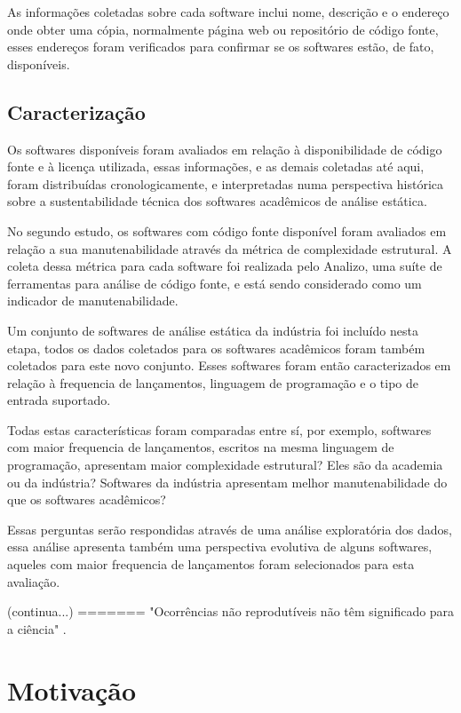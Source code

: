 As informações coletadas sobre cada software inclui nome, descrição e o
endereço onde obter uma cópia, normalmente página web ou repositório de código
fonte, esses endereços foram verificados para confirmar se os softwares estão,
de fato, disponíveis.

\subsection{Caracterização}
Os softwares disponíveis foram avaliados em relação à disponibilidade de código
fonte e à licença utilizada, essas informações, e as demais coletadas até aqui,
foram distribuídas cronologicamente, e interpretadas numa perspectiva histórica
sobre a sustentabilidade técnica dos softwares acadêmicos de análise estática.

No segundo estudo, os softwares com código fonte disponível foram avaliados em
relação a sua manutenabilidade através da métrica de complexidade estrutural. A
coleta dessa métrica para cada software foi realizada pelo Analizo, uma suíte
de ferramentas para análise de código fonte, e está sendo considerado como um
indicador de manutenabilidade.

Um conjunto de softwares de análise estática da indústria foi incluído nesta
etapa, todos os dados coletados para os softwares acadêmicos foram também
coletados para este novo conjunto. Esses softwares foram então caracterizados em
relação à frequencia de lançamentos, linguagem de programação e o tipo de
entrada suportado.

Todas estas características foram comparadas entre sí, por exemplo, softwares
com maior frequencia de lançamentos, escritos na mesma linguagem de
programação, apresentam maior complexidade estrutural? Eles são da academia ou
da indústria? Softwares da indústria apresentam melhor manutenabilidade do que
os softwares acadêmicos?

Essas perguntas serão respondidas através de uma análise exploratória dos
dados, essa análise apresenta também uma perspectiva evolutiva de alguns
softwares, aqueles com maior frequencia de lançamentos foram selecionados para
esta avaliação.

(continua...)
=======
"Ocorrências não reprodutíveis não têm significado para a ciência" \cite{popper2004logica}.

\section{Motivação}

